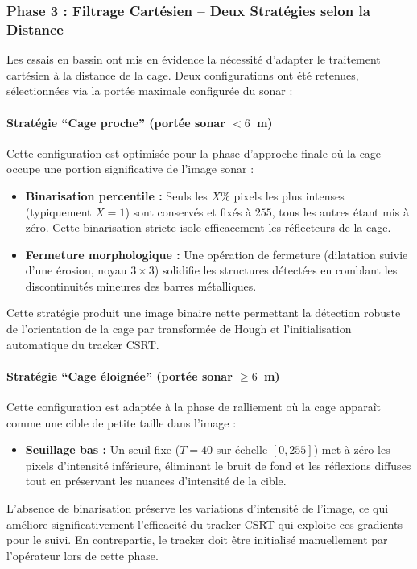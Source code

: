 \subsubsection*{Phase 3 : Filtrage Cartésien -- Deux Stratégies selon la Distance}

Les essais en bassin ont mis en évidence la nécessité d'adapter le traitement cartésien à la distance de la cage. Deux configurations ont été retenues, sélectionnées via la portée maximale configurée du sonar :

\paragraph{Stratégie ``Cage proche'' (portée sonar $< 6$~m)}

Cette configuration est optimisée pour la phase d'approche finale où la cage occupe une portion significative de l'image sonar :
\begin{itemize}
    \item \textbf{Binarisation percentile :} Seuls les $X\%$ pixels les plus intenses (typiquement $X = 1$) sont conservés et fixés à $255$, tous les autres étant mis à zéro. Cette binarisation stricte isole efficacement les réflecteurs de la cage.
    \item \textbf{Fermeture morphologique :} Une opération de fermeture (dilatation suivie d'une érosion, noyau $3 \times 3$) solidifie les structures détectées en comblant les discontinuités mineures des barres métalliques.
\end{itemize}
Cette stratégie produit une image binaire nette permettant la détection robuste de l'orientation de la cage par transformée de Hough et l'initialisation automatique du tracker CSRT.

\paragraph{Stratégie ``Cage éloignée'' (portée sonar $\geq 6$~m)}

Cette configuration est adaptée à la phase de ralliement où la cage apparaît comme une cible de petite taille dans l'image :
\begin{itemize}
    \item \textbf{Seuillage bas :} Un seuil fixe ($T = 40$ sur échelle $[0, 255]$) met à zéro les pixels d'intensité inférieure, éliminant le bruit de fond et les réflexions diffuses tout en préservant les nuances d'intensité de la cible.
\end{itemize}
L'absence de binarisation préserve les variations d'intensité de l'image, ce qui améliore significativement l'efficacité du tracker CSRT qui exploite ces gradients pour le suivi. En contrepartie, le tracker doit être initialisé manuellement par l'opérateur lors de cette phase.

